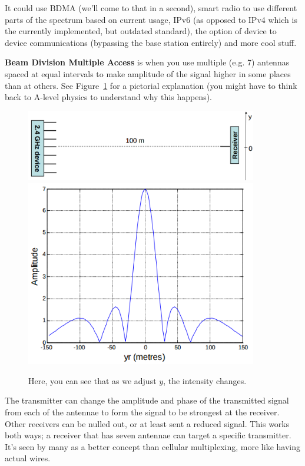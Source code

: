 It could use BDMA (we'll come to that in a second), smart radio to use different
parts of the spectrum based on current usage, IPv6 (as opposed to IPv4 which is
the currently implemented, but outdated standard), the option of device to
device communications (bypassing the base station entirely) and more cool stuff.


\textbf{Beam Division Multiple Access} is when you use multiple (e.g. 7)
antennas spaced at equal intervals to make amplitude of the signal higher in
some places than at others. See Figure~\ref{BDMA} for a pictorial explanation
(you might have to think back to A-level physics to understand why this
happens).

\begin{figure}[H]
  \label{BDMA}
  \includegraphics[width=0.9\textwidth]{images/beam-forming}
  \includegraphics[width=0.9\textwidth]{images/beam-forming-intensity}
  \caption{Here, you can see that as we adjust $y$, the intensity changes.}
\end{figure}

The transmitter can change the amplitude and phase of the transmitted signal
from each of the antennae to form the signal to be strongest at the receiver.
Other receivers can be nulled out, or at least sent a reduced signal. This works
both ways; a receiver that has seven antennae can target a specific transmitter.
It's seen by many as a better concept than cellular multiplexing, more like
having actual wires.

